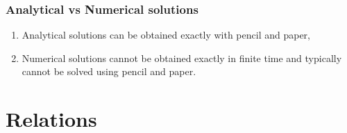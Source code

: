 \documentclass[12pt]{article}
\begin{document}
\begin{flushleft}
	\subsubsection{Analytical vs Numerical solutions}	

	\begin{enumerate}
	\item Analytical solutions can be obtained exactly with pencil and paper, 
	\item Numerical solutions cannot be obtained exactly in finite time and typically cannot be solved using pencil and paper. 
	\end{enumerate} 
	
	
	\pagebreak	
	
	
	\section{Relations}
	

\end{flushleft}
\end{document}
